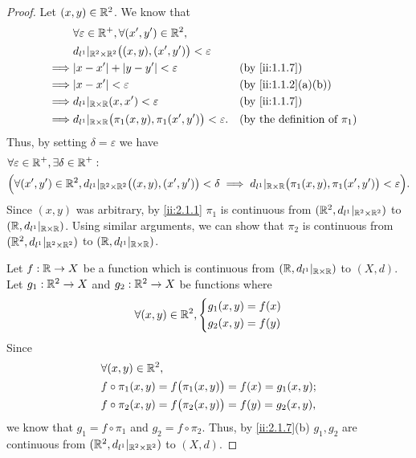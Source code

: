 \begin{proof}
  Let \((x, y) \in \mathbb{R}^2\).
  We know that
  \begin{align*}
             & \forall \varepsilon \in \R^+, \forall (x', y') \in \R^2,                                                                \\
             & d_{l^1}|_{\R^2 \times \R^2}\big((x, y), (x', y')\big) < \varepsilon                                                     \\
    \implies & \abs{x - x'} + \abs{y - y'} < \varepsilon                                  &  & \by{ii:1.1.7}                           \\
    \implies & \abs{x - x'} < \varepsilon                                                 &  & \by{ii:1.1.2}[a,b]                      \\
    \implies & d_{l^1}|_{\R \times \R}(x, x') < \varepsilon                               &  & \by{ii:1.1.7}                           \\
    \implies & d_{l^1}|_{\R \times \R}\big(\pi_1(x, y), \pi_1(x', y')\big) < \varepsilon. &  & \text{(by the definition of \(\pi_1\))}
  \end{align*}
  Thus, by setting \(\delta = \varepsilon\) we have
  \begin{align*}
     & \forall \varepsilon \in \mathbb{R}^+, \exists \delta \in \mathbb{R}^+ :                                                                                                                                 \\
     & \Big(\forall (x', y') \in \mathbb{R}^2, d_{l^1}|_{\mathbb{R}^2 \times \mathbb{R}^2}\big((x, y), (x', y')\big) < \delta \implies d_{l^1}|_{\mathbb{R} \times \mathbb{R}}\big(\pi_1(x, y), \pi_1(x', y')\big) < \varepsilon\Big).
  \end{align*}
  Since \((x, y)\) was arbitrary, by \cref{ii:2.1.1} \(\pi_1\) is continuous from \((\mathbb{R}^2, d_{l^1}|_{\mathbb{R}^2 \times \mathbb{R}^2})\) to \((\mathbb{R}, d_{l^1}|_{\mathbb{R} \times \mathbb{R}})\).
  Using similar arguments, we can show that \(\pi_2\) is continuous from \((\mathbb{R}^2, d_{l^1}|_{\mathbb{R}^2 \times \mathbb{R}^2})\) to \((\mathbb{R}, d_{l^1}|_{\mathbb{R} \times \mathbb{R}})\).

  Let \(f : \mathbb{R} \to X\) be a function which is continuous from \((\mathbb{R}, d_{l^1}|_{\mathbb{R} \times \mathbb{R}})\) to \((X, d)\).
  Let \(g_1 : \mathbb{R}^2 \to X\) and \(g_2 : \mathbb{R}^2 \to X\) be functions where
  \[
    \forall (x, y) \in \mathbb{R}^2, \begin{dcases}
      g_1(x, y) = f(x) \\
      g_2(x, y) = f(y)
    \end{dcases}
  \]
  Since
  \begin{align*}
     & \forall (x, y) \in \mathbb{R}^2,                                         \\
     & f \circ \pi_1(x, y) = f\big(\pi_1(x, y)\big) = f(x) = g_1(x, y); \\
     & f \circ \pi_2(x, y) = f\big(\pi_2(x, y)\big) = f(y) = g_2(x, y),
  \end{align*}
  we know that \(g_1 = f \circ \pi_1\) and \(g_2 = f \circ \pi_2\).
  Thus, by \cref{ii:2.1.7}(b) \(g_1, g_2\) are continuous from \((\mathbb{R}^2, d_{l^1}|_{\mathbb{R}^2 \times \mathbb{R}^2})\) to \((X, d)\).
\end{proof}

